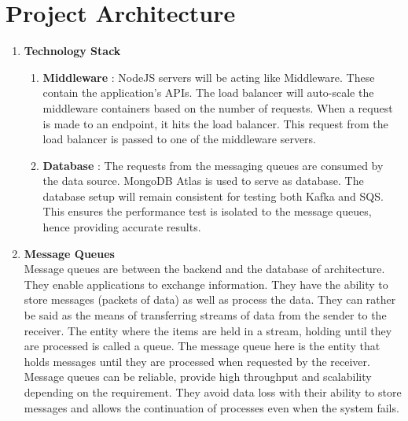 \documentclass{IEEEtran}
\begin{document}
\section{Project Architecture}\label{sec:problem}
\begin{enumerate}
\item \textbf{Technology Stack}
\begin{enumerate}
\item \textbf{Middleware} :
NodeJS servers will be acting like Middleware. These contain the application’s APIs. The load balancer will auto-scale the middleware containers based on the number of requests. When a request is made to an endpoint, it hits the load balancer. This request from the load balancer is passed to one of the middleware servers.  
\item \textbf{Database} :
The requests from the messaging queues are consumed by the data source. MongoDB Atlas is used to serve as database. The database setup will remain consistent for testing both Kafka and SQS. This ensures the performance test is isolated to the message queues, hence providing accurate results. 
\end{enumerate}
    \item \textbf{Message Queues}\\ Message queues are between the backend and the database of architecture. They enable applications to exchange information. They have the ability to store messages (packets of data) as well as process the data. They can rather be said as the means of transferring streams of data from the sender to the receiver. The entity where the items are held in a stream, holding until they are processed is called a queue. The message queue here is the entity that holds messages until they are processed when requested by the receiver. Message queues can be reliable, provide high throughput and scalability depending on the requirement. They avoid data loss with their ability to store messages and allows the continuation of processes even when the system fails.\\
    

\end{enumerate}
\end{document}
